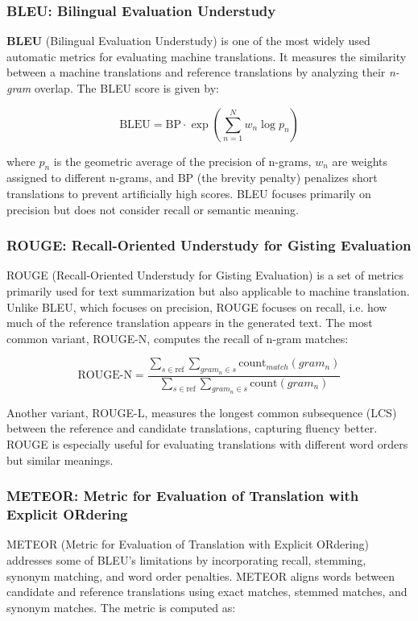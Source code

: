 \subsubsection{BLEU: Bilingual Evaluation Understudy} 
\textbf{BLEU} (Bilingual Evaluation Understudy) \cite{papineniBLEUMethodAutomatic2002} is one of the most widely used automatic metrics for 
evaluating machine translations. It measures the similarity between a machine translations and reference translations by analyzing their \textit{n-gram} overlap. The BLEU score is given by:

\begin{equation}
\text{BLEU} = \text{BP} \cdot \exp\left(\sum_{n=1}^{N} w_n \log p_n \right)
\end{equation}

where  $p_n$ is the geometric average of the precision of n-grams,  $w_n$ are weights assigned to different n-grams, and  $\text{BP}$ (the brevity penalty) 
penalizes short translations to prevent artificially high scores. BLEU focuses primarily on precision but does not consider recall or semantic meaning.

\subsubsection{ROUGE: Recall-Oriented Understudy for Gisting Evaluation}
ROUGE (Recall-Oriented Understudy for Gisting Evaluation) \cite{linROUGEPackageAutomatic2004} is a set of metrics primarily used for text summarization but 
also applicable to machine translation. Unlike BLEU, which focuses on precision, ROUGE focuses on recall, i.e. how much of the reference translation appears in the generated text. 
The most common variant, ROUGE-N, computes the recall of n-gram matches:

\begin{equation}
\text{ROUGE-N} = \frac{\sum_{s \in \text{ref}} \sum_{gram_n \in s} \text{count}_{match}(gram_n)}{\sum_{s \in \text{ref}} \sum_{gram_n \in s} \text{count}(gram_n)}
\end{equation}

Another variant, ROUGE-L, measures the longest common subsequence (LCS) between the reference and candidate translations, capturing 
fluency better. ROUGE is especially useful for evaluating translations with different word orders but similar meanings.

\subsubsection{METEOR: Metric for Evaluation of Translation with Explicit ORdering}
METEOR (Metric for Evaluation of Translation with Explicit ORdering) addresses some of BLEU's limitations by incorporating recall, stemming, synonym matching, and word order penalties. 
METEOR aligns words between candidate and reference translations using exact matches, stemmed matches, and synonym matches. The metric is computed as:


